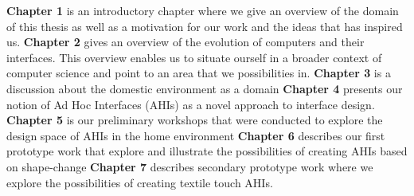 \textbf{Chapter 1} is an introductory chapter where we give an overview of the domain of this thesis as well as a motivation for our work and the ideas that has inspired us.
\blank
\textbf{Chapter 2} gives an overview of the evolution of computers and their interfaces.
This overview enables us to situate ourself in a broader context of computer science and point to an area that we possibilities in.  
\blank
\textbf{Chapter 3} is a discussion about the domestic environment as a domain 
\blank
\textbf{Chapter 4} presents our notion of Ad Hoc Interfaces (AHIs) as a novel approach to interface design.  
\blank
\textbf{Chapter 5} is our preliminary workshops that were conducted to explore the design space of AHIs in the home environment
\blank
\textbf{Chapter 6} describes our first prototype work that explore and illustrate the possibilities of creating AHIs based on shape-change
\blank
\textbf{Chapter 7} describes secondary prototype work where we explore the possibilities of creating textile touch AHIs.

